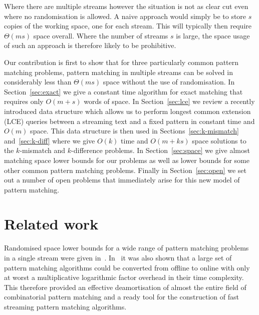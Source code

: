 \documentclass[envcountsame]{llncs}
\begin{document}
Where there are multiple streams however the situation is not as clear cut
even where no randomisation is allowed.  A naive approach would simply
be to store $s$
copies of the working space, one for each stream. This will typically then require $\Theta(ms)$
space overall. Where the number of streams $s$ is large, the space
usage of such an approach is therefore likely to be prohibitive.

Our contribution is first to show that for three particularly common pattern matching
problems, pattern matching in multiple streams can be solved in
considerably less than $\Theta(ms)$ space without the use of randomisation.
In Section~\ref{sec:exact} we give a constant time algorithm for exact matching that requires
only $O(m+s)$ words of space.
In Section~\ref{sec:lce} we review a recently introduced data structure which allows us to perform longest common extension (LCE) queries between a streaming text and a fixed pattern in constant time and $O(m)$ space.  This data structure is then used in Sections~\ref{sec:k-mismatch}
and~\ref{sec:k-diff}  where we give $O(k)$ time and $O(m + ks)$ space solutions to the $k$-mismatch and
$k$-difference problems.  In Section~\ref{sec:space} we
give almost matching space lower bounds for our problems as well as lower bounds for some other common pattern matching problems. Finally in
Section~\ref{sec:open} we set out a number of open problems that immediately arise for this new model of pattern matching.






\section{Related work}

Randomised space lower bounds for a wide range of pattern matching
problems in a single stream were given in~\cite{CJPS:2011}.
In~\cite{CEPP:2011,CS:2011} it was also shown that a large set of
pattern matching algorithms could be converted from offline to online
with only at worst a multiplicative logarithmic factor overhead in
their time complexity. This therefore provided an effective
deamortisation of almost the entire field of combinatorial pattern
matching and a ready tool for the construction of fast streaming
pattern matching algorithms.
\end{document}
